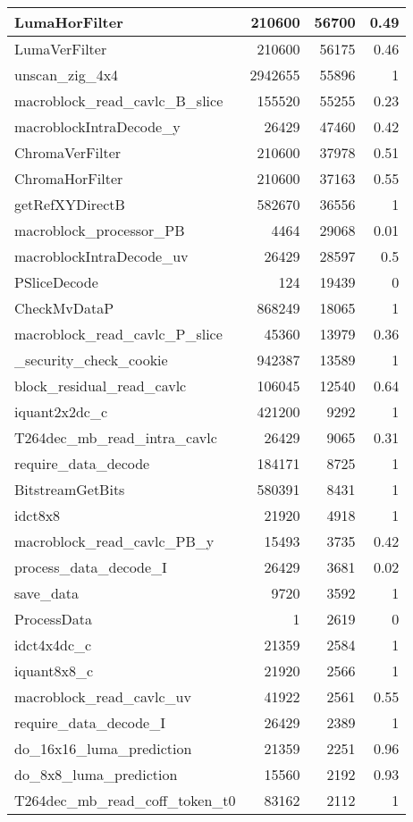 \begin{longtable}[\textwidth]{lrrr}
    LumaHorFilter & 210600 & 56700 & 0.49 \\ \hline
    LumaVerFilter & 210600 & 56175 & 0.46 \\ \hline
    unscan\_zig\_4x4 & 2942655 & 55896 & 1 \\ \hline
    macroblock\_read\_cavlc\_B\_slice & 155520 & 55255 & 0.23 \\ \hline
    macroblockIntraDecode\_y & 26429 & 47460 & 0.42 \\ \hline
    ChromaVerFilter & 210600 & 37978 & 0.51 \\ \hline
    ChromaHorFilter & 210600 & 37163 & 0.55 \\ \hline
    getRefXYDirectB & 582670 & 36556 & 1 \\ \hline
    macroblock\_processor\_PB & 4464  & 29068 & 0.01 \\ \hline
    macroblockIntraDecode\_uv & 26429 & 28597 & 0.5 \\ \hline
    PSliceDecode & 124   & 19439 & 0 \\ \hline
    CheckMvDataP & 868249 & 18065 & 1 \\ \hline
    macroblock\_read\_cavlc\_P\_slice & 45360 & 13979 & 0.36 \\ \hline
    \_security\_check\_cookie & 942387 & 13589 & 1 \\ \hline
    block\_residual\_read\_cavlc & 106045 & 12540 & 0.64 \\ \hline
    iquant2x2dc\_c & 421200 & 9292  & 1 \\ \hline
    T264dec\_mb\_read\_intra\_cavlc & 26429 & 9065  & 0.31 \\ \hline
    require\_data\_decode & 184171 & 8725  & 1 \\ \hline
    BitstreamGetBits & 580391 & 8431  & 1 \\ \hline
    idct8x8 & 21920 & 4918  & 1 \\ \hline
    macroblock\_read\_cavlc\_PB\_y & 15493 & 3735  & 0.42 \\ \hline
    process\_data\_decode\_I & 26429 & 3681  & 0.02 \\ \hline
    save\_data & 9720  & 3592  & 1 \\ \hline
    ProcessData & 1     & 2619  & 0 \\ \hline
    idct4x4dc\_c & 21359 & 2584  & 1 \\ \hline
    iquant8x8\_c & 21920 & 2566  & 1 \\ \hline
    macroblock\_read\_cavlc\_uv & 41922 & 2561  & 0.55 \\ \hline
    require\_data\_decode\_I & 26429 & 2389  & 1 \\ \hline
    do\_16x16\_luma\_prediction & 21359 & 2251  & 0.96 \\ \hline
    do\_8x8\_luma\_prediction & 15560 & 2192  & 0.93 \\ \hline
    T264dec\_mb\_read\_coff\_token\_t0 & 83162 & 2112  & 1 \\
    \bottomrule[1.5pt]
\end{longtable}
